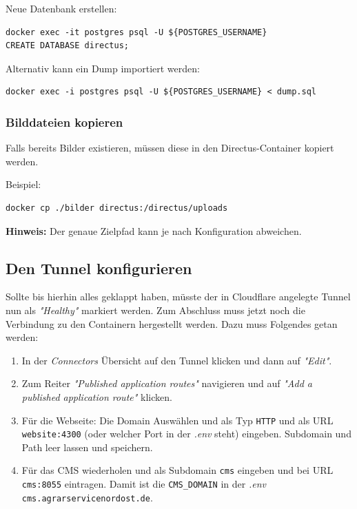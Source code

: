 Neue Datenbank erstellen:
\begin{verbatim}
docker exec -it postgres psql -U ${POSTGRES_USERNAME}
CREATE DATABASE directus;
\end{verbatim}

Alternativ kann ein Dump importiert werden:

\begin{verbatim}
docker exec -i postgres psql -U ${POSTGRES_USERNAME} < dump.sql
\end{verbatim}

\subsubsection{Bilddateien kopieren}

Falls bereits Bilder existieren, müssen diese in den Directus-Container kopiert werden.

Beispiel:

\begin{verbatim}
docker cp ./bilder directus:/directus/uploads
\end{verbatim}

\textbf{Hinweis:} Der genaue Zielpfad kann je nach Konfiguration abweichen.

\subsection{Den Tunnel konfigurieren}

Sollte bis hierhin alles geklappt haben, müsste der in Cloudflare angelegte Tunnel nun als
\textit{"Healthy"} markiert werden. Zum Abschluss muss jetzt noch die Verbindung zu den Containern
hergestellt werden. Dazu muss Folgendes getan werden:

\begin{enumerate}
    \item In der \textit{Connectors} Übersicht auf den Tunnel klicken und dann auf \textit{"Edit"}.
    \item Zum Reiter \textit{"Published application routes"} navigieren und auf \textit{"Add a
    published application route"} klicken.
    \item Für die Webseite: Die Domain Auswählen und als Typ \texttt{HTTP} und als URL
    \texttt{website:4300} (oder welcher Port in der \textit{.env} steht) eingeben. Subdomain und
    Path leer lassen und speichern.
    \item Für das CMS wiederholen und als Subdomain \texttt{cms} eingeben und bei URL
    \texttt{cms:8055} eintragen. Damit ist die \texttt{CMS\_DOMAIN} in der \textit{.env}
    \texttt{cms.agrarservicenordost.de}.
\end{enumerate}


